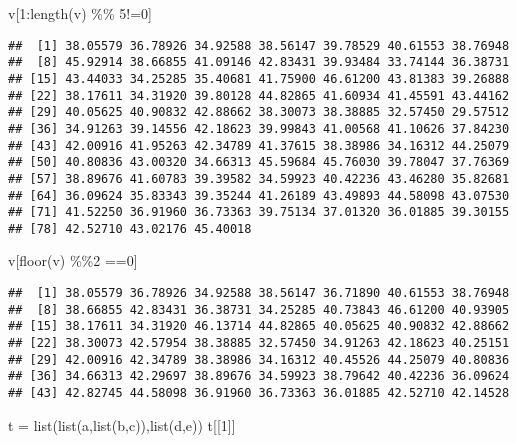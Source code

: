 \documentclass[]{article}
\newenvironment{Shaded}{\begin{snugshade}}{\end{snugshade}}
\newcommand{\DecValTok}[1]{\textcolor[rgb]{0.00,0.00,0.81}{#1}}
\newcommand{\FunctionTok}[1]{\textcolor[rgb]{0.00,0.00,0.00}{#1}}
\newcommand{\NormalTok}[1]{#1}
\newcommand{\OtherTok}[1]{\textcolor[rgb]{0.56,0.35,0.01}{#1}}
\newcommand{\SpecialCharTok}[1]{\textcolor[rgb]{0.00,0.00,0.00}{#1}}
\newcommand{\StringTok}[1]{\textcolor[rgb]{0.31,0.60,0.02}{#1}}
\begin{document}
\begin{Shaded}
\begin{Highlighting}[]
\NormalTok{v[}\DecValTok{1}\SpecialCharTok{:}\FunctionTok{length}\NormalTok{(v) }\SpecialCharTok{\%\%} \DecValTok{5}\SpecialCharTok{!=}\DecValTok{0}\NormalTok{]}
\end{Highlighting}
\end{Shaded}

\begin{verbatim}
##  [1] 38.05579 36.78926 34.92588 38.56147 39.78529 40.61553 38.76948
##  [8] 45.92914 38.66855 41.09146 42.83431 39.93484 33.74144 36.38731
## [15] 43.44033 34.25285 35.40681 41.75900 46.61200 43.81383 39.26888
## [22] 38.17611 34.31920 39.80128 44.82865 41.60934 41.45591 43.44162
## [29] 40.05625 40.90832 42.88662 38.30073 38.38885 32.57450 29.57512
## [36] 34.91263 39.14556 42.18623 39.99843 41.00568 41.10626 37.84230
## [43] 42.00916 41.95263 42.34789 41.37615 38.38986 34.16312 44.25079
## [50] 40.80836 43.00320 34.66313 45.59684 45.76030 39.78047 37.76369
## [57] 38.89676 41.60783 39.39582 34.59923 40.42236 43.46280 35.82681
## [64] 36.09624 35.83343 39.35244 41.26189 43.49893 44.58098 43.07530
## [71] 41.52250 36.91960 36.73363 39.75134 37.01320 36.01885 39.30155
## [78] 42.52710 43.02176 45.40018
\end{verbatim}

\begin{Shaded}
\begin{Highlighting}[]
\NormalTok{v[}\FunctionTok{floor}\NormalTok{(v) }\SpecialCharTok{\%\%}\DecValTok{2} \SpecialCharTok{==}\DecValTok{0}\NormalTok{]}
\end{Highlighting}
\end{Shaded}

\begin{verbatim}
##  [1] 38.05579 36.78926 34.92588 38.56147 36.71890 40.61553 38.76948
##  [8] 38.66855 42.83431 36.38731 34.25285 40.73843 46.61200 40.93905
## [15] 38.17611 34.31920 46.13714 44.82865 40.05625 40.90832 42.88662
## [22] 38.30073 42.57954 38.38885 32.57450 34.91263 42.18623 40.25151
## [29] 42.00916 42.34789 38.38986 34.16312 40.45526 44.25079 40.80836
## [36] 34.66313 42.29697 38.89676 34.59923 38.79642 40.42236 36.09624
## [43] 42.82745 44.58098 36.91960 36.73363 36.01885 42.52710 42.14528
\end{verbatim}

\begin{Shaded}
\begin{Highlighting}[]
\NormalTok{t }\OtherTok{=} \FunctionTok{list}\NormalTok{(}\FunctionTok{list}\NormalTok{(}\StringTok{\textquotesingle{}a\textquotesingle{}}\NormalTok{,}\FunctionTok{list}\NormalTok{(}\StringTok{\textquotesingle{}b\textquotesingle{}}\NormalTok{,}\StringTok{\textquotesingle{}c\textquotesingle{}}\NormalTok{)),}\FunctionTok{list}\NormalTok{(}\StringTok{\textquotesingle{}d\textquotesingle{}}\NormalTok{,}\StringTok{\textquotesingle{}e\textquotesingle{}}\NormalTok{))}
\NormalTok{t[[}\DecValTok{1}\NormalTok{]]}
\end{Highlighting}
\end{Shaded}
\end{document}
